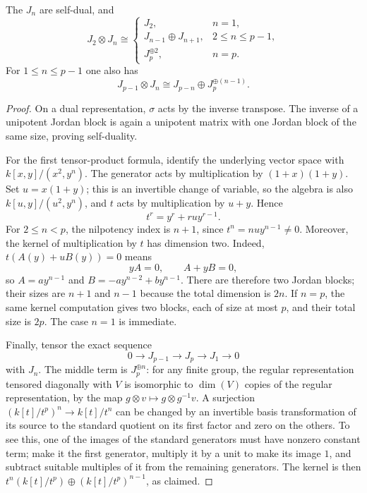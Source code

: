 \begin{proposition}\label{prop:lec17-jordan-products}
The $J_n$ are self-dual, and
\[
 J_2\otimes J_n\cong
 \begin{cases}
 J_2,&n=1,\\
 J_{n-1}\oplus J_{n+1},&2\leq n\leq p-1,\\
 J_p^{\oplus2},&n=p.
 \end{cases}
\]
For $1\leq n\leq p-1$ one also has
\[
 J_{p-1}\otimes J_n\cong J_{p-n}\oplus J_p^{\oplus(n-1)}.
\]
\end{proposition}
\begin{proof}
On a dual representation, $\sigma$ acts by the inverse transpose.
The inverse of a unipotent Jordan block is again a unipotent matrix with
one Jordan block of the same size, proving self-duality.

For the first tensor-product formula, identify the underlying vector
space with $k[x,y]/(x^2,y^n)$. The generator acts by multiplication by
$(1+x)(1+y)$. Set $u=x(1+y)$; this is an invertible change of variable,
so the algebra is also $k[u,y]/(u^2,y^n)$, and $t$ acts by multiplication
by $u+y$. Hence
\[
 t^r=y^r+r u y^{r-1}.
\]
For $2\leq n<p$, the nilpotency index is $n+1$, since
$t^n=nuy^{n-1}\ne0$. Moreover, the kernel of multiplication by $t$
has dimension two. Indeed, $t(A(y)+uB(y))=0$ means
\[
 yA=0,\qquad A+yB=0,
\]
so $A=ay^{n-1}$ and $B=-ay^{n-2}+by^{n-1}$. There are therefore two
Jordan blocks; their sizes are $n+1$ and $n-1$ because the total
dimension is $2n$. If $n=p$, the same kernel computation gives two
blocks, each of size at most $p$, and their total size is $2p$.
The case $n=1$ is immediate.

Finally, tensor the exact sequence
\[
 0\longrightarrow J_{p-1}\longrightarrow J_p
 \longrightarrow J_1\longrightarrow0
\]
with $J_n$. The middle term is $J_p^{\oplus n}$: for any finite group,
the regular representation tensored diagonally with $V$ is isomorphic
to $\dim(V)$ copies of the regular representation, by the map
$g\otimes v\mapsto g\otimes g^{-1}v$.
A surjection $(k[t]/t^p)^n\to k[t]/t^n$ can be changed by an invertible
basis transformation of its source to the standard quotient on its
first factor and zero on the others. To see this, one of the images of
the standard generators must have nonzero constant term; make it the
first generator, multiply it by a unit to make its image $1$, and
subtract suitable multiples of it from the remaining generators.
The kernel is then
$t^n(k[t]/t^p)\oplus(k[t]/t^p)^{n-1}$, as claimed.
\end{proof}

